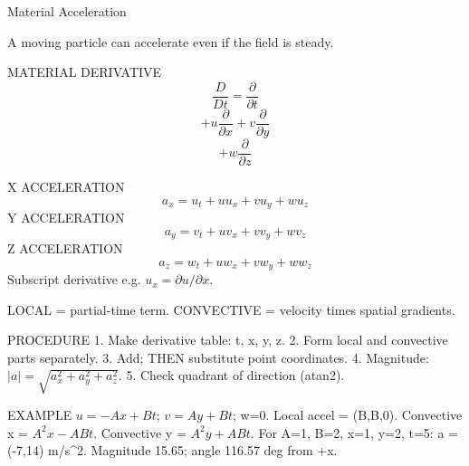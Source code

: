 Material Acceleration

A moving particle can accelerate even if the field is steady.

MATERIAL DERIVATIVE
$$\frac{D}{Dt}=\frac{\partial}{\partial t}$$
$$+u\frac{\partial}{\partial x}+v\frac{\partial}{\partial y}$$
$$+w\frac{\partial}{\partial z}$$

X ACCELERATION
$$a_x=u_t+uu_x+vu_y+wu_z$$
Y ACCELERATION
$$a_y=v_t+uv_x+vv_y+wv_z$$
Z ACCELERATION
$$a_z=w_t+uw_x+vw_y+ww_z$$
Subscript derivative e.g. $u_x=\partial u/\partial x$.

LOCAL = partial-time term.
CONVECTIVE = velocity times spatial gradients.

PROCEDURE
1. Make derivative table: t, x, y, z.
2. Form local and convective parts separately.
3. Add; THEN substitute point coordinates.
4. Magnitude: $|a|=\sqrt{a_x^2+a_y^2+a_z^2}$.
5. Check quadrant of direction (atan2).

EXAMPLE
$u=-Ax+Bt$; $v=Ay+Bt$; w=0.
Local accel = (B,B,0).
Convective x = $A^2x-ABt$.
Convective y = $A^2y+ABt$.
For A=1, B=2, x=1, y=2, t=5:
a = (-7,14) m/s^2.
Magnitude 15.65; angle 116.57 deg from +x.
